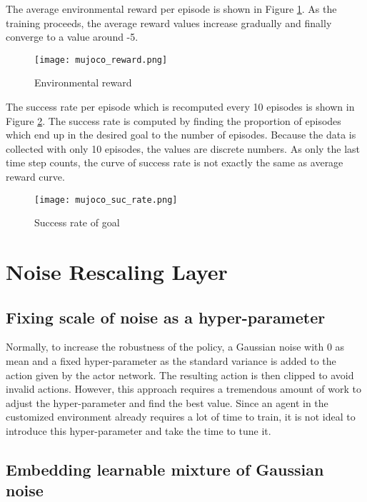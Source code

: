 \documentclass[a4paper, 12pt]{report}
\begin{document}
        The average environmental reward per episode is shown in Figure \ref{mujocoreward}. As the training proceeds, the average reward values increase gradually and finally converge to a value around -5.

        \begin{figure}[H]
        \centering
        \texttt{[image: mujoco\_reward.png]}
        \caption{Environmental reward}
            \label{mujocoreward}
        \end{figure}

        The success rate per episode which is recomputed every 10 episodes is shown in Figure \ref{mujocosuc}. The success rate is computed by finding the proportion of episodes which end up in the desired goal to the number of episodes. Because the data is collected with only 10 episodes, the values are discrete numbers. As only the last time step counts, the curve of success rate is not exactly the same as average reward curve.

        \begin{figure}[H]
        \centering
        \texttt{[image: mujoco\_suc\_rate.png]}
        \caption{Success rate of goal}
            \label{mujocosuc}
        \end{figure}

\chapter {Noise Rescaling Layer}

    \section{Fixing scale of noise as a hyper-parameter}

    Normally, to increase the robustness of the policy, a Gaussian noise with 0 as mean and a fixed hyper-parameter as the standard variance is added to the action given by the actor network. The resulting action is then clipped to avoid invalid actions. However, this approach requires a tremendous amount of work to adjust the hyper-parameter and find the best value. Since an agent in the customized environment already requires a lot of time to train, it is not ideal to introduce this hyper-parameter and take the time to tune it.

    \section{Embedding learnable mixture of Gaussian noise}
    
\end{document}
